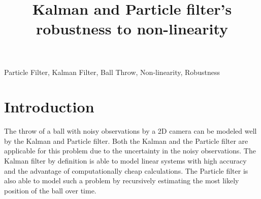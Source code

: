 \documentclass[conference]{IEEEtran}
\begin{document}
\title{Kalman and Particle filter's robustness to non-linearity}

\author{
}
\maketitle

\begin{abstract}

\end{abstract}

\begin{IEEEkeywords}
Particle Filter, Kalman Filter, Ball Throw, Non-linearity, Robustness
\end{IEEEkeywords}

\section{Introduction}
The throw of a ball with noisy observations by a 2D camera can be modeled well by the Kalman and Particle filter. 
Both the Kalman and the Particle filter are applicable for this problem due to the uncertainty in the noisy observations.
The Kalman filter by definition is able to model linear systems with high accuracy and the advantage of computationally cheap calculations. 
The Particle filter is also able to model such a problem by recursively estimating the most likely position of the ball over time.
\end{document}
